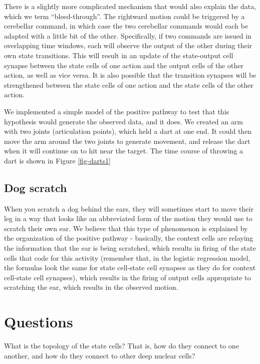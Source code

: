 \documentclass{article}
\theoremstyle{definition}
\begin{document}
There is a slightly more complicated mechanism that would also explain
the data, which we term ``bleed-through''. The rightward motion could
be triggered by a cerebellar command, in which case the two cerebellar
commands would each be adapted with a little bit of the
other. Specifically, if two commands are issued in overlapping time
windows, each will observe the output of the other during their own
state transitions. This will result in an update of the state-output
cell synapse between the state cells of one action and the output
cells of the other action, as well as vice versa. It is also possible
that the transition synapses will be strengthened between the state
cells of one action and the state cells of the other action.

We implemented a simple model of the positive pathway to test that
this hypothesis would generate the observed data, and it does. We
created an arm with two joints (articulation points), which held a
dart at one end. It could then move the arm around the two joints to
generate movement, and release the dart when it will continue on to
hit near the target. The time course of throwing a dart is shown in
Figure \ref{fig-darts1}



\subsection{Dog scratch}

When you scratch a dog behind the ears, they will sometimes start to
move their leg in a way that looks like an abbreviated form of the
motion they would use to scratch their own ear. We believe that this
type of phenomenon is explained by the organization of the positive
pathway - basically, the context cells are relaying the information
that the ear is being scratched, which results in firing of the state
cells that code for this activity (remember that, in the logistic
regression model, the formulas look the same for state cell-state cell
synapses as they do for context cell-state cell synapses), which
results in the firing of output cells appropriate to scratching the
ear, which results in the observed motion.

\section{Questions}

\begin{q}
What is the topology of the state cells? That is, how do they connect
to one another, and how do they connect to other deep nuclear cells?
\end{q}
\end{document}
